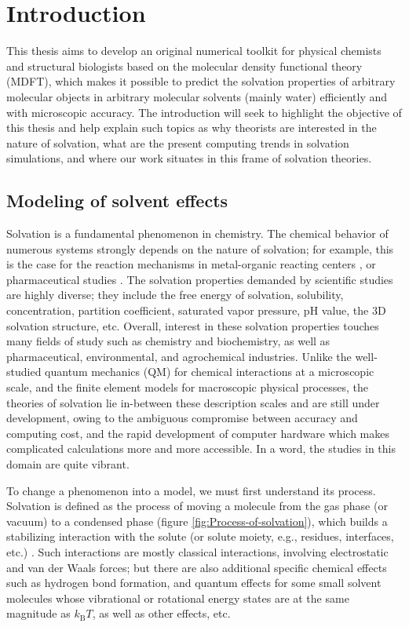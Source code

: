 
\chapter{Introduction\label{chpt:introduction}}

This thesis aims to develop an original numerical toolkit for physical
chemists and structural biologists based on the molecular density
functional theory (\acs{MDFT}), which makes it possible to predict
the solvation properties of arbitrary molecular objects in arbitrary
molecular solvents (mainly water) efficiently and with microscopic
accuracy. The introduction will seek to highlight the objective of
this thesis and help explain such topics as why theorists are interested
in the nature of solvation, what are the present computing trends
in solvation simulations, and where our work situates in this frame
of solvation theories.

\section{Modeling of solvent effects}

Solvation is a fundamental phenomenon in chemistry. The chemical behavior
of numerous systems strongly depends on the nature of solvation; for
example, this is the case for the reaction mechanisms in metal-organic
reacting centers \citep{Mn-oxo,PCET}, or pharmaceutical studies \citep{drug_1_Perlovich,drug_2_Perlovich,drug_3}.
The solvation properties demanded by scientific studies are highly
diverse; they include the free energy of solvation, solubility, concentration,
partition coefficient, saturated vapor pressure, pH value, the 3D
solvation structure, etc. Overall, interest in these solvation properties
touches many fields of study such as chemistry and biochemistry, as
well as pharmaceutical, environmental, and agrochemical industries.
Unlike the well-studied quantum mechanics (\acs{QM}) for chemical
interactions at a microscopic scale, and the finite element models
for macroscopic physical processes, the theories of solvation lie
in-between these description scales and are still under development,
owing to the ambiguous compromise between accuracy and computing cost,
and the rapid development of computer hardware which makes complicated
calculations more and more accessible. In a word, the studies in this
domain are quite vibrant.

To change a phenomenon into a model, we must first understand its
process. Solvation is defined as the process of moving a molecule
from the gas phase (or vacuum) to a condensed phase (figure \ref{fig:Process-of-solvation}),
which builds a stabilizing interaction with the solute (or solute
moiety, e.g., residues, interfaces, etc.) \citep{iupac}. Such interactions
are mostly classical interactions, involving electrostatic and van
der Waals forces; but there are also additional specific chemical
effects such as hydrogen bond formation, and quantum effects for some
small solvent molecules whose vibrational or rotational energy states
are at the same magnitude as $k_{\mathrm{B}}T$, as well as other
effects, etc.

